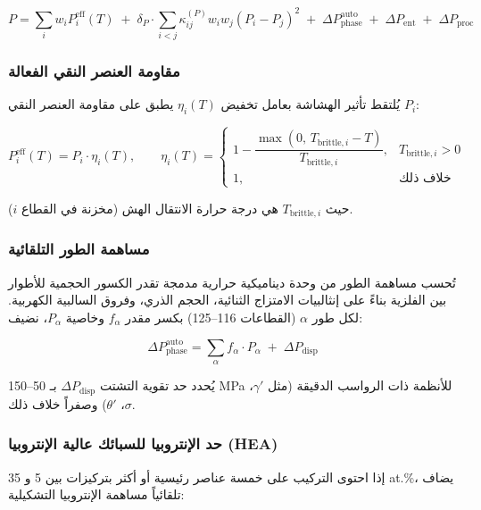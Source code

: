 \documentclass[11pt,a4paper]{article}
\begin{document}
\begin{otherlanguage}{arabic}
		\begin{equation}
			\boxed{
				P = \sum_i w_i P_i^{\text{eff}}(T) \;+\; \delta_P \cdot \sum_{i<j} \kappa_{ij}^{(P)} w_i w_j (P_i - P_j)^2 \;+\; \Delta P_{\text{phase}}^{\text{auto}} \;+\; \Delta P_{\text{ent}} \;+\; \Delta P_{\text{proc}}
			}
			\label{eq:plcm-auto}
		\end{equation}
		
		\subsubsection{مقاومة العنصر النقي الفعالة}
		يُلتقط تأثير الهشاشة بعامل تخفيض \(\eta_i(T)\) يطبق على مقاومة العنصر النقي \(P_i\):
		
		\begin{equation}
			P_i^{\text{eff}}(T) = P_i \cdot \eta_i(T), \qquad
			\eta_i(T) = 
			\begin{cases}
				1 - \dfrac{\max(0,\, T_{\text{brittle},i} - T)}{T_{\text{brittle},i}}, & T_{\text{brittle},i} > 0 \\
				1, & \text{خلاف ذلك}
			\end{cases}
		\end{equation}
		
		حيث \(T_{\text{brittle},i}\) هي درجة حرارة الانتقال الهش (مخزنة في القطاع \(i\)).
		
		\subsubsection{مساهمة الطور التلقائية}
		تُحسب مساهمة الطور من وحدة ديناميكية حرارية مدمجة تقدر الكسور الحجمية للأطوار بين الفلزية بناءً على إنثالبيات الامتزاج الثنائية، الحجم الذري، وفروق السالبية الكهربية. لكل طور \(\alpha\) (القطاعات 116–125) بكسر مقدر \(f_{\alpha}\) وخاصية \(P_{\alpha}\)، نضيف:
		
		\begin{equation}
			\Delta P_{\text{phase}}^{\text{auto}} = \sum_{\alpha} f_{\alpha} \cdot P_{\alpha} \;+\; \Delta P_{\text{disp}}
		\end{equation}
		
		يُحدد حد تقوية التشتت \(\Delta P_{\text{disp}}\) بـ 50–150 MPa للأنظمة ذات الرواسب الدقيقة (مثل \(\gamma'\)، \(\sigma\)، \(\theta'\)) وصفراً خلاف ذلك.
		
		\subsubsection{حد الإنتروبيا للسبائك عالية الإنتروبيا (HEA)}
		إذا احتوى التركيب على خمسة عناصر رئيسية أو أكثر بتركيزات بين 5 و 35 at.\%، يضاف تلقائياً مساهمة الإنتروبيا التشكيلية:
		

\end{otherlanguage}
\end{document}
